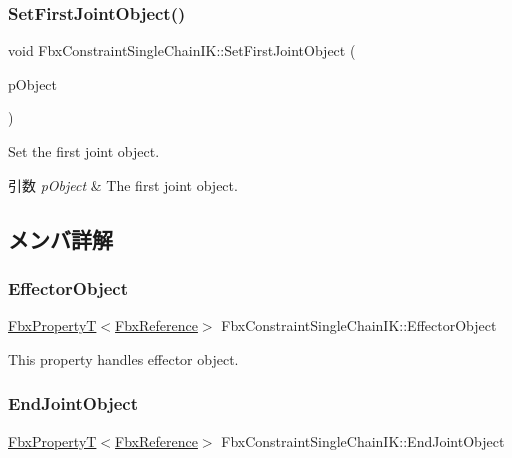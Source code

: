 \subsubsection{\texorpdfstring{Set\+First\+Joint\+Object()}{SetFirstJointObject()}}
{\footnotesize\ttfamily void Fbx\+Constraint\+Single\+Chain\+I\+K\+::\+Set\+First\+Joint\+Object (\begin{DoxyParamCaption}\item[{\hyperlink{class_fbx_object}{Fbx\+Object} $\ast$}]{p\+Object }\end{DoxyParamCaption})}

Set the first joint object. 
\begin{DoxyParams}{引数}
{\em p\+Object} & The first joint object. \\
\hline
\end{DoxyParams}


\subsection{メンバ詳解}
\mbox{\label{class_fbx_constraint_single_chain_i_k_ab7b3721f2b7f267b6dd35ce38ffa7bbe}} 
\subsubsection{\texorpdfstring{Effector\+Object}{EffectorObject}}
{\footnotesize\ttfamily \hyperlink{class_fbx_property_t}{Fbx\+PropertyT}$<$\hyperlink{fbxtypes_8h_a44df6a2eec915cf27cd481e5c5e48a24}{Fbx\+Reference}$>$ Fbx\+Constraint\+Single\+Chain\+I\+K\+::\+Effector\+Object}

This property handles effector object. \mbox{\label{class_fbx_constraint_single_chain_i_k_acb671de7c974cc53fba45d34dcdf9db4}} 
\subsubsection{\texorpdfstring{End\+Joint\+Object}{EndJointObject}}
{\footnotesize\ttfamily \hyperlink{class_fbx_property_t}{Fbx\+PropertyT}$<$\hyperlink{fbxtypes_8h_a44df6a2eec915cf27cd481e5c5e48a24}{Fbx\+Reference}$>$ Fbx\+Constraint\+Single\+Chain\+I\+K\+::\+End\+Joint\+Object}

